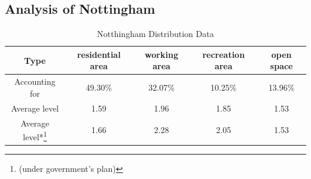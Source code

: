 \subsection{Analysis of Nottingham}
\begin{table}[tb]
\centering
  \begin{tabular}{c|cccc}
    \hline
    Type & residential area & working area & recreation area & open space \\
    \hline
    Accounting for & 49.30\% & 32.07\% & 10.25\% & 13.96\% \\
    \hline
    Average level & 1.59 & 1.96 & 1.85 & 1.53 \\
    Average level*\footnote{(under government's plan)} & 1.66 & 2.28 & 2.05 & 1.53 \\
    \hline
  \end{tabular}
  \caption{Notthingham Distribution Data}
  \label{tab:nottingham-data}
\end{table}

